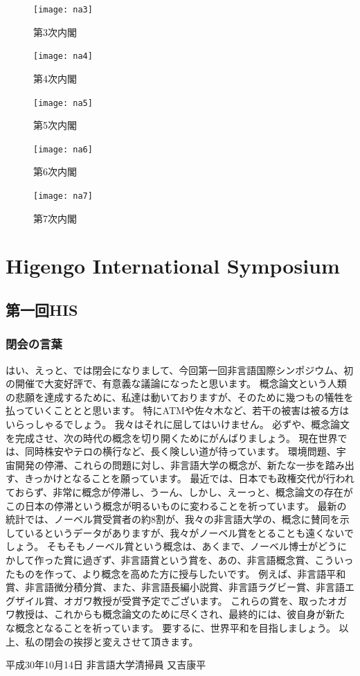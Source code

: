 \begin{figure}[H]
\centering
\texttt{[image: na3]}
\caption{第3次内閣}
\label{na3}
\end{figure}

\begin{figure}[H]
\centering
\texttt{[image: na4]}
\caption{第4次内閣}
\label{na4}
\end{figure}

\begin{figure}[H]
\centering
\texttt{[image: na5]}
\caption{第5次内閣}
\label{na5}
\end{figure}

\begin{figure}[H]
\centering
\texttt{[image: na6]}
\caption{第6次内閣}
\label{na6}
\end{figure}

\begin{figure}[H]
\centering
\texttt{[image: na7]}
\caption{第7次内閣}
\label{na7}
\end{figure}


\newpage
\section{Higengo International Symposium}
\subsection{第一回HIS}
\subsubsection{閉会の言葉}
はい、えっと、では閉会になりまして、今回第一回非言語国際シンポジウム、初の開催で大変好評で、有意義な議論になったと思います。
概念論文という人類の悲願を達成するために、私達は動いておりますが、そのために幾つもの犠牲を払っていくこととと思います。
特にATMや佐々木など、若干の被害は被る方はいらっしゃるでしょう。
我々はそれに屈してはいけません。
必ずや、概念論文を完成させ、次の時代の概念を切り開くためにがんばりましょう。
現在世界では、同時株安やテロの横行など、長く険しい道が待っています。
環境問題、宇宙開発の停滞、これらの問題に対し、非言語大学の概念が、新たな一歩を踏み出す、きっかけとなることを願っています。
最近では、日本でも政権交代が行われておらず、非常に概念が停滞し、うーん、しかし、えーっと、概念論文の存在がこの日本の停滞という概念が明るいものに変わることを祈っています。
最新の統計では、ノーベル賞受賞者の約8割が、我々の非言語大学の、概念に賛同を示しているというデータがありますが、我々がノーベル賞をとることも遠くないでしょう。
そもそもノーベル賞という概念は、あくまで、ノーベル博士がどうにかして作った賞に過ぎず、非言語賞という賞を、あの、非言語概念賞、こういったものを作って、より概念を高めた方に授与したいです。
例えば、非言語平和賞、非言語微分積分賞、また、非言語長編小説賞、非言語ラグビー賞、非言語エグザイル賞、オガワ教授が受賞予定でございます。
これらの賞を、取ったオガワ教授は、これからも概念論文のために尽くされ、最終的には、彼自身が新たな概念となることを祈っています。
要するに、世界平和を目指しましょう。
以上、私の閉会の挨拶と変えさせて頂きます。
\par
平成30年10月14日 非言語大学清掃員 又吉康平

